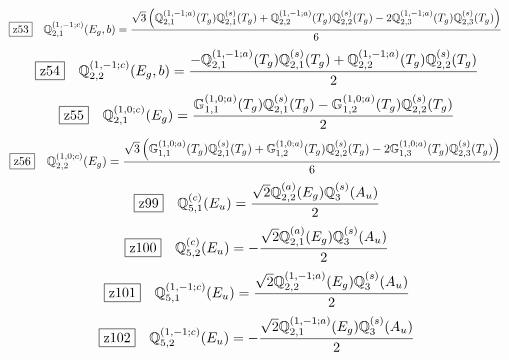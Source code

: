 \documentclass[fleqn,10pt,landscape]{jsarticle}
\begin{document}
\begin{dmath*}
\hspace*{3mm}\fbox{z53}\quad \mathbb{Q}_{2,1}^{(1,-1;c)}(E_{g},b)=\frac{\sqrt{3} \left(\mathbb{Q}_{2,1}^{(1,-1;a)}(T_{g}) \mathbb{Q}_{2,1}^{(s)}(T_{g}) + \mathbb{Q}_{2,2}^{(1,-1;a)}(T_{g}) \mathbb{Q}_{2,2}^{(s)}(T_{g}) - 2 \mathbb{Q}_{2,3}^{(1,-1;a)}(T_{g}) \mathbb{Q}_{2,3}^{(s)}(T_{g})\right)}{6}
\end{dmath*}
\begin{dmath*}
\hspace*{3mm}\fbox{z54}\quad \mathbb{Q}_{2,2}^{(1,-1;c)}(E_{g},b)=\frac{- \mathbb{Q}_{2,1}^{(1,-1;a)}(T_{g}) \mathbb{Q}_{2,1}^{(s)}(T_{g}) + \mathbb{Q}_{2,2}^{(1,-1;a)}(T_{g}) \mathbb{Q}_{2,2}^{(s)}(T_{g})}{2}
\end{dmath*}
\begin{dmath*}
\hspace*{3mm}\fbox{z55}\quad \mathbb{Q}_{2,1}^{(1,0;c)}(E_{g})=\frac{\mathbb{G}_{1,1}^{(1,0;a)}(T_{g}) \mathbb{Q}_{2,1}^{(s)}(T_{g}) - \mathbb{G}_{1,2}^{(1,0;a)}(T_{g}) \mathbb{Q}_{2,2}^{(s)}(T_{g})}{2}
\end{dmath*}
\begin{dmath*}
\hspace*{3mm}\fbox{z56}\quad \mathbb{Q}_{2,2}^{(1,0;c)}(E_{g})=\frac{\sqrt{3} \left(\mathbb{G}_{1,1}^{(1,0;a)}(T_{g}) \mathbb{Q}_{2,1}^{(s)}(T_{g}) + \mathbb{G}_{1,2}^{(1,0;a)}(T_{g}) \mathbb{Q}_{2,2}^{(s)}(T_{g}) - 2 \mathbb{G}_{1,3}^{(1,0;a)}(T_{g}) \mathbb{Q}_{2,3}^{(s)}(T_{g})\right)}{6}
\end{dmath*}
\begin{dmath*}
\hspace*{3mm}\fbox{z99}\quad \mathbb{Q}_{5,1}^{(c)}(E_{u})=\frac{\sqrt{2} \mathbb{Q}_{2,2}^{(a)}(E_{g}) \mathbb{Q}_{3}^{(s)}(A_{u})}{2}
\end{dmath*}
\begin{dmath*}
\hspace*{3mm}\fbox{z100}\quad \mathbb{Q}_{5,2}^{(c)}(E_{u})=- \frac{\sqrt{2} \mathbb{Q}_{2,1}^{(a)}(E_{g}) \mathbb{Q}_{3}^{(s)}(A_{u})}{2}
\end{dmath*}
\begin{dmath*}
\hspace*{3mm}\fbox{z101}\quad \mathbb{Q}_{5,1}^{(1,-1;c)}(E_{u})=\frac{\sqrt{2} \mathbb{Q}_{2,2}^{(1,-1;a)}(E_{g}) \mathbb{Q}_{3}^{(s)}(A_{u})}{2}
\end{dmath*}
\begin{dmath*}
\hspace*{3mm}\fbox{z102}\quad \mathbb{Q}_{5,2}^{(1,-1;c)}(E_{u})=- \frac{\sqrt{2} \mathbb{Q}_{2,1}^{(1,-1;a)}(E_{g}) \mathbb{Q}_{3}^{(s)}(A_{u})}{2}
\end{dmath*}
\end{document}
